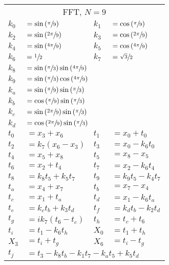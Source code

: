 \begin{tabular}{|p{4.3pt}l|p{4.3pt}l|}\toprule \multicolumn{4}{|c|}{FFT, $N=9$} \\
$k_0 $ &$= \sin\left(\sfrac{\pi}{9}\right)$ & $k_1 $ &$= \cos\left(\sfrac{\pi}{9}\right)$\\ 
$k_2 $ &$= \sin\left(\sfrac{2\pi}{9}\right)$ & $k_3 $ &$= \cos\left(\sfrac{2\pi}{9}\right)$\\ 
$k_4 $ &$= \sin\left(\sfrac{4\pi}{9}\right)$ & $k_5 $ &$= \cos\left(\sfrac{4\pi}{9}\right)$\\ 
$k_6 $ &$= \sfrac{1}{2}$ & $k_7 $ &$= \sfrac{\sqrt{3}}{2}$\\ 
$k_8 $ &\multicolumn{3}{l|}{$= \sin\left(\sfrac{\pi}{3}\right)\sin\left(\sfrac{4\pi}{9}\right)$}\\ 
$k_9 $ &\multicolumn{3}{l|}{$= \sin\left(\sfrac{\pi}{3}\right)\cos\left(\sfrac{4\pi}{9}\right)$}\\ 
$k_a $ &\multicolumn{3}{l|}{$= \sin\left(\sfrac{\pi}{9}\right)\sin\left(\sfrac{\pi}{3}\right)$}\\ 
$k_b $ &\multicolumn{3}{l|}{$= \cos\left(\sfrac{\pi}{9}\right)\sin\left(\sfrac{\pi}{3}\right)$}\\ 
$k_c $ &\multicolumn{3}{l|}{$= \sin\left(\sfrac{2\pi}{9}\right)\sin\left(\sfrac{\pi}{3}\right)$}\\ 
$k_d $ &\multicolumn{3}{l|}{$= \cos\left(\sfrac{2\pi}{9}\right)\sin\left(\sfrac{\pi}{3}\right)$}\\ 
$t_0 $ &$= x_3 + x_6$ & $t_1 $ &$= x_0 + t_0$\\ 
$t_2 $ &$= k_7(x_6 - x_3)$ & $t_3 $ &$= x_0 - k_6t_0$\\ 
$t_4 $ &$= x_5 + x_8$ & $t_5 $ &$= x_8 - x_5$\\ 
$t_6 $ &$= x_2 + t_4$ & $t_7 $ &$= x_2 - k_6t_4$\\ 
$t_8 $ &$= k_8t_5 + k_5t_7$ & $t_9 $ &$= k_9t_5 - k_4t_7$\\ 
$t_a $ &$= x_4 + x_7$ & $t_b $ &$= x_7 - x_4$\\ 
$t_c $ &$= x_1 + t_a$ & $t_d $ &$= x_1 - k_6t_a$\\ 
$t_e $ &$= k_ct_b + k_3t_d$ & $t_f $ &$= k_dt_b - k_2t_d$\\ 
$t_g $ &$= ik_7(t_6 - t_c)$ & $t_h $ &$= t_c + t_6$\\ 
$t_i $ &$= t_1 - k_6t_h$ & $X_0 $ &$= t_1 + t_h$\\ 
$X_3 $ &$= t_i + t_g$ & $X_6 $ &$= t_i - t_g$\\ 
$t_j $ &\multicolumn{3}{l|}{$= t_3 - k_8t_b - k_1t_7 - k_at_5 + k_5t_d$}\\ 

\end{tabular}
